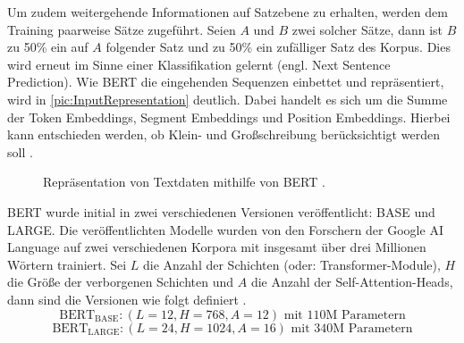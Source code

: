 \noindent
Um zudem weitergehende Informationen auf Satzebene zu erhalten, werden dem Training paarweise Sätze zugeführt. Seien $A$ und $B$ zwei solcher Sätze, dann ist $B$ zu 50\% ein auf $A$ folgender Satz und zu 50\% ein zufälliger Satz des Korpus. Dies wird erneut im Sinne einer Klassifikation gelernt (engl. Next Sentence Prediction). Wie \ac{BERT} die eingehenden Sequenzen einbettet und repräsentiert, wird in \autoref{pic:InputRepresentation} deutlich. Dabei handelt es sich um die Summe der Token Embeddings, Segment Embeddings und Position Embeddings. Hierbei kann entschieden werden, ob Klein- und Großschreibung berücksichtigt werden soll \cite[S.~3-5]{DEV19}.
\\

\begin{figure}[h!]
  \centering
  \caption{Repräsentation von Textdaten mithilfe von BERT \cite[S.~3]{DEV19}.}
  \label{pic:InputRepresentation}
\end{figure}

\noindent
\ac{BERT} wurde initial in zwei verschiedenen Versionen veröffentlicht: BASE und LARGE. Die veröffentlichten Modelle wurden von den Forschern der Google AI Language auf zwei verschiedenen Korpora mit insgesamt über drei Millionen Wörtern trainiert. Sei $L$ die Anzahl der Schichten (oder: Transformer-Module), $H$ die Größe der verborgenen Schichten und $A$ die Anzahl der Self-Attention-Heads, dann sind die Versionen wie folgt definiert \cite[S.~3-5]{DEV19}. $$\text{BERT}_{\text{BASE}}: (L=12, H=768, A=12) \text{ mit } 110 \text{M Parametern}$$ $$\text{BERT}_{\text{LARGE}}: (L=24, H=1024, A=16) \text{ mit } 340 \text{M Parametern}$$


